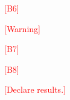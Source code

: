 \documentclass[prl,aps,reprint,twocolumn,10pt,superscriptaddress,floatfix]{revtex4-2}
\newcommand{\tmp}[1]{\textcolor{red}{#1}}
\begin{document}
\tmp{[B6]}

\tmp{[Warning]}

\tmp{[B7]}

\tmp{[B8]}

\tmp{[Declare results.]}


\end{document}
